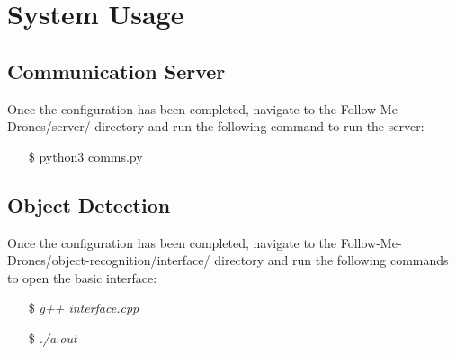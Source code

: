 \chapter{System Usage}

\section{Communication Server}

Once the configuration has been completed, navigate to the Follow-Me-Drones/server/ directory and run the following command to run the server:
\begin{itemize}
    \item[\$] python3 comms.py
\end{itemize}

\section{Object Detection}

Once the configuration has been completed, navigate to the Follow-Me-Drones/object-recognition/interface/ directory and run the following commands to open the basic interface:
\begin{itemize}
    \item[\$] \textit{g++ interface.cpp}
    \item[\$] \textit{./a.out}
\end{itemize}

